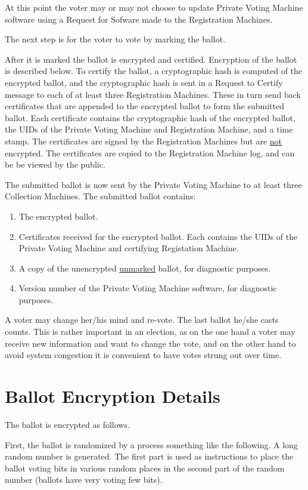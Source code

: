 \documentclass[12pt]{article}
\begin{document}
At this point
the voter may or may not choose to update Private Voting Machine
software using a Request for Sofware made to the Registration Machines.

The next step is for the voter to vote by marking the ballot.

After it is marked the ballot is encrypted and certified.  Encryption of the
ballot is described below.  To certify the ballot, a cryptographic hash
is computed of the encrypted ballot, and the cryptographic hash is sent
in a Request to Certify message to each of at least three Registration
Machines.  These in turn send back certificates that are appended
to the encrypted ballot to form the submitted ballot.  Each
certificate contains the cryptographic hash of the encrypted ballot, the
UIDs of the Private Voting Machine and Registration Machine,
and a time stamp.  The certificates
are signed by the Registration Machines but are \underline{not} encrypted.
The certificates are copied to the Registration Machine log, and can be
be viewed by the public.

The submitted ballot is now sent by the Private Voting
Machine to at least three Collection Machines.  The submitted
ballot contains:
\begin{enumerate}
\item The encrypted ballot.
\item Certificates received for the encrypted ballot.  Each contains the
UIDs of the Private Voting Machine and certifying Registation Machine.
\item A copy of the unencrypted \underline{unmarked} ballot, for
diagnostic purposes.
\item Version number of the Private Voting Machine software, for
diagnostic purposes.
\end{enumerate}


A voter may change her/his mind and re-vote.  The last ballot
he/she casts counts.  This is rather important in an election,
as on the one hand a voter may receive new information and
want to change the vote, and on the other hand to avoid system
congestion it is convenient to have votes strung out over time.

\section{Ballot Encryption Details}

The ballot is encrypted as follows.

First, the ballot is randomized by a process something like
the following.  A long random number is generated.  The first
part is used as instructions to place the ballot voting bits in
various random places in the second part of the random number
(ballots have very voting few bits).
\end{document}
